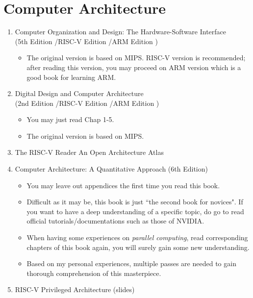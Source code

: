 \documentclass{article}
\begin{document}
\section{Computer Architecture}
\begin{enumerate}
    \item Computer Organization and Design: The Hardware-Software Interface\\
    (5th Edition \cite{patterson2013computerMIPS}/RISC-V Edition \cite{pattersoncomputerRV}/ARM Edition \cite{patterson2016computerARM})
    \begin{itemize}
        \item The original version is based on MIPS.
        RISC-V version is recommended; after reading this version, you may proceed on ARM version which is a good book for learning ARM.
    \end{itemize}
    \item Digital Design and Computer Architecture\\
    (2nd Edition \cite{harris2015digitalMIPS}/RISC-V Edition \cite{harris2021digitalRV}/ARM Edition \cite{harris2015digitalARM})
    \begin{itemize}
        \item You may just read Chap 1-5.
        \item The original version is based on MIPS.
    \end{itemize}
    \item The RISC-V Reader An Open Architecture Atlas \cite{patterson2017risc}
    \item Computer Architecture: A Quantitative Approach (6th Edition) \cite{hennessy2018computer}
    \begin{itemize}
        \item You may leave out appendices the first time you read this book.
        \item Difficult as it may be, this book is just ``the second book for novices".
        If you want to have a deep understanding of a specific topic, do go to read official tutorials/documentations such as those of NVIDIA.
        \item When having some experiences on \emph{parallel computing}, read corresponding chapters of this book again, you will surely gain some new understanding.
        \item Based on my personal experiences, multiple passes are needed to gain thorough comprehension of this masterpiece.
    \end{itemize}
    \item RISC-V Privileged Architecture (slides)\\

\end{enumerate}
\end{document}
